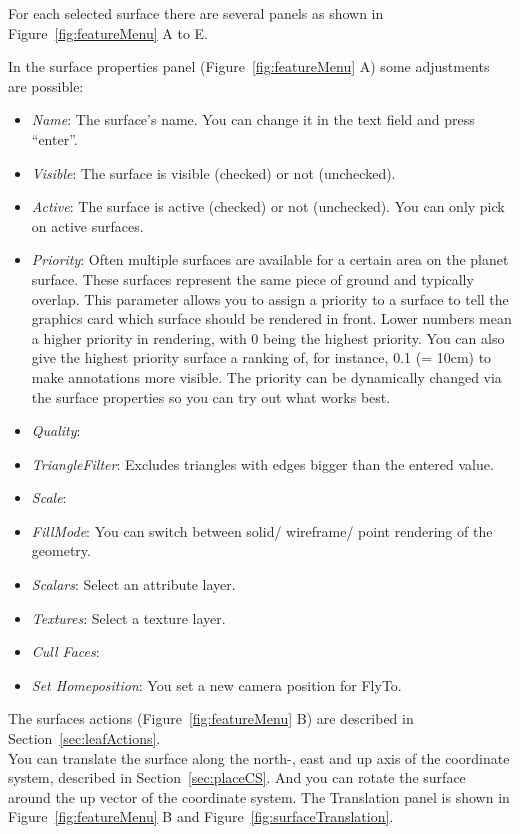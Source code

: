 For each selected surface there are several panels as shown in Figure~\ref{fig:featureMenu} A to E. 

In the surface properties panel (Figure~\ref{fig:featureMenu} A) some adjustments are possible:
\begin{itemize}
	\item \textit{Name}: The surface's name. You can change it in the text field and press ``enter''.
	\item \textit{Visible}: The surface is visible (checked) or not (unchecked).
	\item \textit{Active}: The surface is active (checked) or not (unchecked). You can only pick on active surfaces.
	\item \textit{Priority}:  Often multiple surfaces are available for a certain area on the planet surface. These surfaces represent the same piece of ground and typically overlap. This parameter allows you to assign a priority to a surface to tell the graphics card which surface should be rendered in front. Lower numbers mean a higher priority in rendering, with 0 being the highest priority. You can also give the highest priority surface a ranking of, for instance, 0.1 (= 10cm) to make annotations more visible. The priority can be dynamically changed via the surface properties so you can try out what works best.
	\item \textit{Quality}: 
	\item \textit{TriangleFilter}: Excludes triangles with edges bigger than the entered value.
	\item \textit{Scale}: 
	\item \textit{FillMode}: You can switch between solid/ wireframe/ point rendering of the geometry.
	\item \textit{Scalars}: Select an attribute layer.
	\item \textit{Textures}: Select a texture layer.
	\item \textit{Cull Faces}:
	\item \textit{Set Homeposition}: You set a new camera position for FlyTo.
\end{itemize}

The surfaces actions (Figure~\ref{fig:featureMenu} B) are described in Section~\ref{sec:leafActions}. \\


You can translate the surface along the north-, east and up axis of the coordinate system, described in Section~\ref{sec:placeCS}. And you can rotate the surface around the up vector of the coordinate system. The Translation panel is shown in Figure~\ref{fig:featureMenu} B and Figure~\ref{fig:surfaceTranslation}. \\

